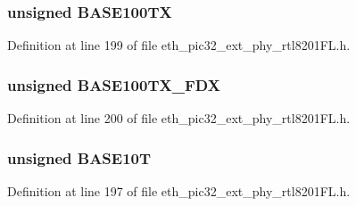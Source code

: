 \hypertarget{union_____a_n_l_p_a_dbits__t_ad869e01954d2d35cb31bd254c50c44e1}{}
\subsubsection[{B\+A\+S\+E100\+T\+X}]{\setlength{\rightskip}{0pt plus 5cm}unsigned B\+A\+S\+E100\+T\+X}\label{union_____a_n_l_p_a_dbits__t_ad869e01954d2d35cb31bd254c50c44e1}


Definition at line 199 of file eth\+\_\+pic32\+\_\+ext\+\_\+phy\+\_\+rtl8201\+F\+L.\+h.

\hypertarget{union_____a_n_l_p_a_dbits__t_a62518f2f0d4bbb7e6f305cf513b7db56}{}
\subsubsection[{B\+A\+S\+E100\+T\+X\+\_\+\+F\+D\+X}]{\setlength{\rightskip}{0pt plus 5cm}unsigned B\+A\+S\+E100\+T\+X\+\_\+\+F\+D\+X}\label{union_____a_n_l_p_a_dbits__t_a62518f2f0d4bbb7e6f305cf513b7db56}


Definition at line 200 of file eth\+\_\+pic32\+\_\+ext\+\_\+phy\+\_\+rtl8201\+F\+L.\+h.

\hypertarget{union_____a_n_l_p_a_dbits__t_a19e0499585f3d54c98df590edff71b52}{}
\subsubsection[{B\+A\+S\+E10\+T}]{\setlength{\rightskip}{0pt plus 5cm}unsigned B\+A\+S\+E10\+T}\label{union_____a_n_l_p_a_dbits__t_a19e0499585f3d54c98df590edff71b52}


Definition at line 197 of file eth\+\_\+pic32\+\_\+ext\+\_\+phy\+\_\+rtl8201\+F\+L.\+h.

